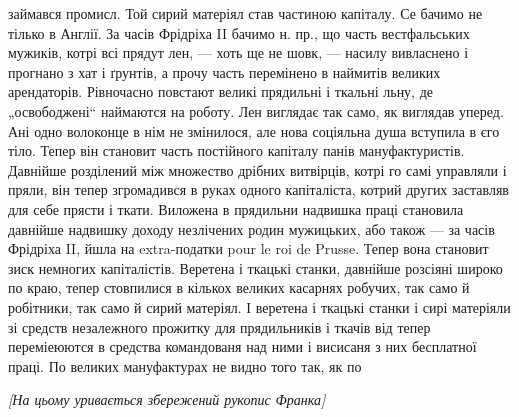 займався промисл. Той сирий матеріял став частиною 
капіталу. Се бачимо не тілько в Англії. За часів
Фрідріха II бачимо н. пр., що часть вестфальських мужиків,
котрі всі прядут лен, — хоть ще не шовк, — насилу
вивласнено і прогнано з хат і ґрунтів, а прочу часть перемінено
в наймитів великих арендаторів. Рівночасно повстают
великі прядильні і ткальні льну, де „освободжені“ наймаются
на роботу. Лен виглядає так само, як виглядав уперед.
Ані одно волоконце в нім не змінилося, але нова соціяльна
душа вступила в єго тіло. Тепер він становит часть постійного
капіталу панів мануфактуристів. Давнійше розділений
між множество дрібних витвірців, котрі го самі управляли
і пряли, він тепер згромадився в руках одного капіталіста,
котрий других заставляв для себе прясти і ткати. Виложена
в прядильни надвишка праці становила давнійше надвишку
доходу незлічених родин мужицьких, або також — за часів
Фрідріха II, йшла на extra-податки pour le roi de Prusse.
Тепер вона становит зиск немногих капіталістів. Веретена
і ткацькі станки, давнійше розсіяні широко по краю, тепер
стовпилися в кількох великих касарнях робучих, так само
й робітники, так само й сирий матеріял. І веретена і ткацькі
станки і сирі матеріяли зі средств незалежного прожитку
для прядильників і ткачів від тепер переміеюются в средства
командованя над ними і висисаня з них бесплатної
праці. По великих мануфактурах не видно того так, як по
\linebreak[4]
\makebox[\linewidth]{\dotfill}
\centerline{\emph{[На цьому уривається збережений рукопис Франка]}}
